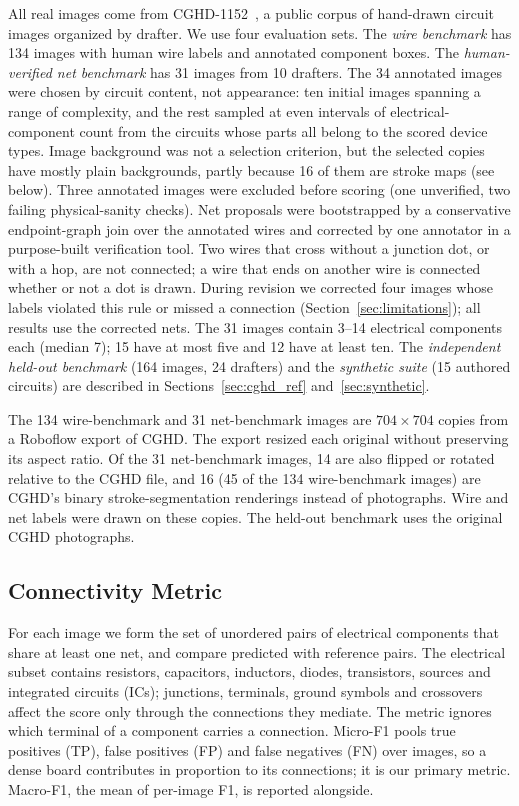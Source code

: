 \documentclass[journal]{IEEEtran}
\begin{document}
All real images come from CGHD-1152~\cite{bayer2021cghd,cghd1152data}, a public corpus of hand-drawn circuit images organized by drafter. We use four evaluation sets. The \emph{wire benchmark} has 134 images with human wire labels and annotated component boxes. The \emph{human-verified net benchmark} has 31 images from 10 drafters. The 34 annotated images were chosen by circuit content, not appearance: ten initial images spanning a range of complexity, and the rest sampled at even intervals of electrical-component count from the circuits whose parts all belong to the scored device types. Image background was not a selection criterion, but the selected copies have mostly plain backgrounds, partly because 16 of them are stroke maps (see below). Three annotated images were excluded before scoring (one unverified, two failing physical-sanity checks). Net proposals were bootstrapped by a conservative endpoint-graph join over the annotated wires and corrected by one annotator in a purpose-built verification tool. Two wires that cross without a junction dot, or with a hop, are not connected; a wire that ends on another wire is connected whether or not a dot is drawn. During revision we corrected four images whose labels violated this rule or missed a connection (Section~\ref{sec:limitations}); all results use the corrected nets. The 31 images contain 3--14 electrical components each (median 7); 15 have at most five and 12 have at least ten. The \emph{independent held-out benchmark} (164 images, 24 drafters) and the \emph{synthetic suite} (15 authored circuits) are described in Sections~\ref{sec:cghd_ref} and~\ref{sec:synthetic}.

The 134 wire-benchmark and 31 net-benchmark images are $704\times704$ copies from a Roboflow export of CGHD. The export resized each original without preserving its aspect ratio. Of the 31 net-benchmark images, 14 are also flipped or rotated relative to the CGHD file, and 16 (45 of the 134 wire-benchmark images) are CGHD's binary stroke-segmentation renderings instead of photographs. Wire and net labels were drawn on these copies. The held-out benchmark uses the original CGHD photographs.

\subsection{Connectivity Metric}

For each image we form the set of unordered pairs of electrical components that share at least one net, and compare predicted with reference pairs. The electrical subset contains resistors, capacitors, inductors, diodes, transistors, sources and integrated circuits (ICs); junctions, terminals, ground symbols and crossovers affect the score only through the connections they mediate. The metric ignores which terminal of a component carries a connection. Micro-F1 pools true positives (TP), false positives (FP) and false negatives (FN) over images, so a dense board contributes in proportion to its connections; it is our primary metric. Macro-F1, the mean of per-image F1, is reported alongside.
\end{document}
